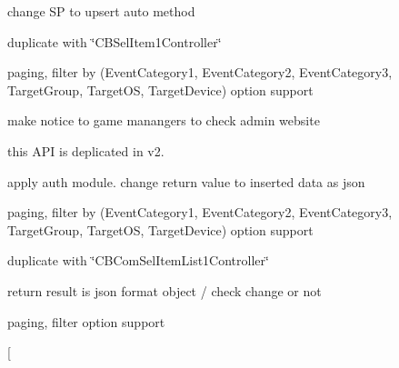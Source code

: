 
\begin{DoxyRefList}
\item[\label{a00001__todo000003}%
\hypertarget{a00001__todo000003}{}%
File \hyperlink{a00119}{C\+B\+Add\+Member\+Item\+Purchase\+Controller.cs} ]change SP to upsert auto method  
\item[\label{a00001__todo000005}%
\hypertarget{a00001__todo000005}{}%
File \hyperlink{a00126}{C\+B\+Com\+Sel\+Item\+List1\+Controller.cs} ]duplicate with \char`\"{}\+C\+B\+Sel\+Item1\+Controller\char`\"{}  
\item[\label{a00001__todo000006}%
\hypertarget{a00001__todo000006}{}%
File \hyperlink{a00128}{C\+B\+Com\+Sel\+Member\+Game\+Infoes\+Controller.cs} ]paging, filter by (Event\+Category1, Event\+Category2, Event\+Category3, Target\+Group, Target\+OS, Target\+Device) option support  
\item[\label{a00001__todo000007}%
\hypertarget{a00001__todo000007}{}%
File \hyperlink{a00138}{C\+B\+Com\+Udt\+Member\+Item\+Purchase\+Controller.cs} ]make notice to game manangers to check admin website  
\item[\label{a00001__todo000008}%
\hypertarget{a00001__todo000008}{}%
File \hyperlink{a00139}{C\+B\+Ins\+Anonymous\+Reg\+Member\+Controller.cs} ]this A\+PI is deplicated in v2.  
\item[\label{a00001__todo000009}%
\hypertarget{a00001__todo000009}{}%
File \hyperlink{a00140}{C\+B\+Ins\+Reg\+Member\+Controller.cs} ]apply auth module. change return value to inserted data as json  
\item[\label{a00001__todo000011}%
\hypertarget{a00001__todo000011}{}%
File \hyperlink{a00143}{C\+B\+Sel\+Game\+Events\+Controller.cs} ]paging, filter by (Event\+Category1, Event\+Category2, Event\+Category3, Target\+Group, Target\+OS, Target\+Device) option support  
\item[\label{a00001__todo000012}%
\hypertarget{a00001__todo000012}{}%
File \hyperlink{a00145}{C\+B\+Sel\+Item1\+Controller.cs} ]duplicate with \char`\"{}\+C\+B\+Com\+Sel\+Item\+List1\+Controller\char`\"{}  
\item[\label{a00001__todo000013}%
\hypertarget{a00001__todo000013}{}%
File \hyperlink{a00147}{C\+B\+Sel\+Login\+I\+D\+Dupe\+Check\+Controller.cs} ]return result is json format object / check change or not  
\item[\label{a00001__todo000014}%
\hypertarget{a00001__todo000014}{}%
File \hyperlink{a00149}{C\+B\+Sel\+Member\+Game\+Info\+Stages\+Controller.cs} ]paging, filter option support  
\item[\label{a00001__todo000015}%

\end{DoxyRefList}
